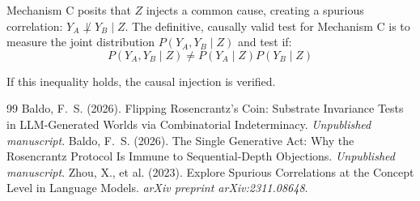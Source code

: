 \documentclass[12pt,a4paper]{article}
\begin{document}
Mechanism C posits that $Z$ injects a common cause, creating a spurious correlation: $Y_A \not\perp Y_B \mid Z$. The definitive, causally valid test for Mechanism C is to measure the joint distribution $P(Y_A, Y_B \mid Z)$ and test if:
\begin{equation}
P(Y_A, Y_B \mid Z) \neq P(Y_A \mid Z) P(Y_B \mid Z)
\end{equation}

If this inequality holds, the causal injection is verified.

\begin{thebibliography}{99}
 Baldo, F.~S. (2026). Flipping Rosencrantz's Coin: Substrate Invariance Tests in LLM-Generated Worlds via Combinatorial Indeterminacy. \emph{Unpublished manuscript}.
 Baldo, F.~S. (2026). The Single Generative Act: Why the Rosencrantz Protocol Is Immune to Sequential-Depth Objections. \emph{Unpublished manuscript}.
 Zhou, X., et al. (2023). Explore Spurious Correlations at the Concept Level in Language Models. \emph{arXiv preprint arXiv:2311.08648}.
\end{thebibliography}
\end{document}
